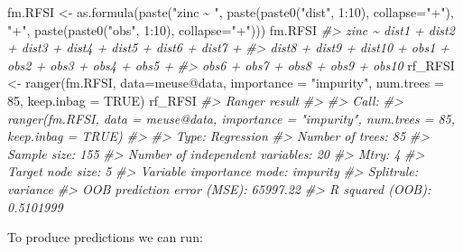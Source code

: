 \documentclass[
  graybox,natbib,nospthms]{svmono}
\newenvironment{Shaded}{\begin{snugshade}}{\end{snugshade}}
\newcommand{\AttributeTok}[1]{\textcolor[rgb]{0.61,0.61,0.61}{#1}}
\newcommand{\CommentTok}[1]{\textcolor[rgb]{0.37,0.37,0.37}{\textit{#1}}}
\newcommand{\ConstantTok}[1]{\textcolor[rgb]{0,0,0}{#1}}
\newcommand{\DecValTok}[1]{\textcolor[rgb]{0.06,0.06,0.06}{#1}}
\newcommand{\FunctionTok}[1]{\textcolor[rgb]{0,0,0}{#1}}
\newcommand{\NormalTok}[1]{#1}
\newcommand{\OtherTok}[1]{\textcolor[rgb]{0.37,0.37,0.37}{#1}}
\newcommand{\SpecialCharTok}[1]{\textcolor[rgb]{0,0,0}{#1}}
\newcommand{\StringTok}[1]{\textcolor[rgb]{0.5,0.5,0.5}{#1}}
\begin{document}
\begin{Shaded}
\begin{Highlighting}[]
\NormalTok{fm.RFSI }\OtherTok{\textless{}{-}} \FunctionTok{as.formula}\NormalTok{(}\FunctionTok{paste}\NormalTok{(}\StringTok{"zinc \textasciitilde{} "}\NormalTok{, }\FunctionTok{paste}\NormalTok{(}\FunctionTok{paste0}\NormalTok{(}\StringTok{"dist"}\NormalTok{, }\DecValTok{1}\SpecialCharTok{:}\DecValTok{10}\NormalTok{), }\AttributeTok{collapse=}\StringTok{"+"}\NormalTok{), }\StringTok{"+"}\NormalTok{, }\FunctionTok{paste}\NormalTok{(}\FunctionTok{paste0}\NormalTok{(}\StringTok{"obs"}\NormalTok{, }\DecValTok{1}\SpecialCharTok{:}\DecValTok{10}\NormalTok{), }\AttributeTok{collapse=}\StringTok{"+"}\NormalTok{)))}
\NormalTok{fm.RFSI}
\CommentTok{\#\textgreater{} zinc \textasciitilde{} dist1 + dist2 + dist3 + dist4 + dist5 + dist6 + dist7 + }
\CommentTok{\#\textgreater{}     dist8 + dist9 + dist10 + obs1 + obs2 + obs3 + obs4 + obs5 + }
\CommentTok{\#\textgreater{}     obs6 + obs7 + obs8 + obs9 + obs10}
\NormalTok{rf\_RFSI }\OtherTok{\textless{}{-}} \FunctionTok{ranger}\NormalTok{(fm.RFSI, }\AttributeTok{data=}\NormalTok{meuse}\SpecialCharTok{@}\NormalTok{data, }\AttributeTok{importance =} \StringTok{"impurity"}\NormalTok{, }\AttributeTok{num.trees =} \DecValTok{85}\NormalTok{, }\AttributeTok{keep.inbag =} \ConstantTok{TRUE}\NormalTok{)}
\NormalTok{rf\_RFSI}
\CommentTok{\#\textgreater{} Ranger result}
\CommentTok{\#\textgreater{} }
\CommentTok{\#\textgreater{} Call:}
\CommentTok{\#\textgreater{}  ranger(fm.RFSI, data = meuse@data, importance = "impurity", num.trees = 85,      keep.inbag = TRUE) }
\CommentTok{\#\textgreater{} }
\CommentTok{\#\textgreater{} Type:                             Regression }
\CommentTok{\#\textgreater{} Number of trees:                  85 }
\CommentTok{\#\textgreater{} Sample size:                      155 }
\CommentTok{\#\textgreater{} Number of independent variables:  20 }
\CommentTok{\#\textgreater{} Mtry:                             4 }
\CommentTok{\#\textgreater{} Target node size:                 5 }
\CommentTok{\#\textgreater{} Variable importance mode:         impurity }
\CommentTok{\#\textgreater{} Splitrule:                        variance }
\CommentTok{\#\textgreater{} OOB prediction error (MSE):       65997.22 }
\CommentTok{\#\textgreater{} R squared (OOB):                  0.5101999}
\end{Highlighting}
\end{Shaded}

To produce predictions we can run:
\end{document}
